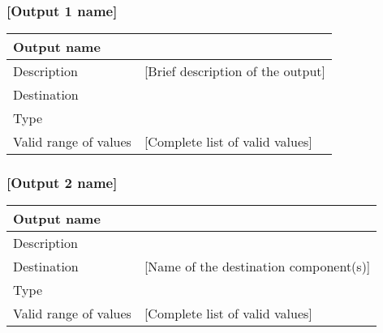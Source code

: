 \subsubsection{[Output 1 name]}

\begin{longtable}{p{}p{}}
\toprule
Output name				& \ttfamily [Name of the output] \\
\midrule
Description				& [Brief description of the output] \\
\midrule
Destination				& \ttfamily [Name of the destination component(s)] \\ 
\midrule
Type					& \ttfamily [Type of the output] \\
\midrule
Valid range of values	& [Complete list of valid values] \\
\bottomrule
\end{longtable}


\subsubsection{[Output 2 name]}

\begin{longtable}{p{}p{}}
\toprule
Output name				& \ttfamily [Name of the output] \\
\midrule
Description				& \ttfamily [Brief description of the output] \\
\midrule
Destination				& [Name of the destination component(s)] \\ 
\midrule
Type					& \ttfamily [Type of the output] \\
\midrule
Valid range of values	& [Complete list of valid values] \\
\bottomrule
\end{longtable}
